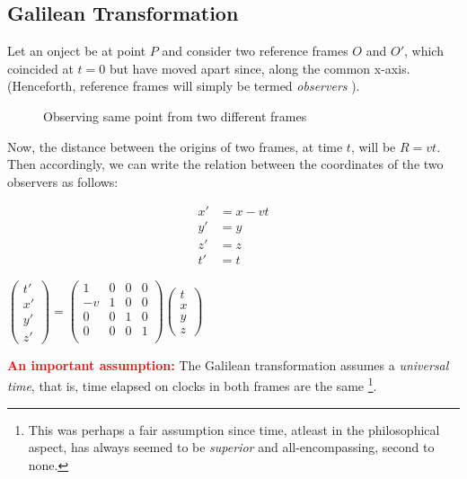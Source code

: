 \subsection{Galilean Transformation}
Let an onject be at point $P$ and consider two reference frames $O$ and $O'$, which coincided at $t=0$ but have moved apart since, along the common x-axis. (Henceforth, reference frames will simply be termed \textit{observers} ).
\begin{figure}[H]
    \centering 
    
    \caption{Observing same point from two different frames}
    \label{fig:gal_rel}
\end{figure}
\noindent
Now, the distance between the origins of two frames, at time $t$, will be $R = vt$. Then accordingly, we can write the relation between the coordinates of the two observers as follows:
   \begin{center}
     \begin{minipage}{0.5\textwidth}
    \begin{align*}
        x' &= x-vt\\
        y'&=y\\
        z' &=z \\
        t'&=t
    \end{align*}
\end{minipage}\hfill
\begin{minipage}{0.5\textwidth}
    
    
    $\begin{pmatrix}
        t'\\x'\\y'\\z'
    \end{pmatrix} = \begin{pmatrix}
        1&0&0&0 \\
        -v&1&0&0 \\
        0&0&1&0 \\
        0&0&0&1 \\
    \end{pmatrix}    \begin{pmatrix}
        t\\x\\y\\z
    \end{pmatrix}$
\end{minipage}
   \end{center}
\textcolor{red}{\textbf{An important assumption:}} The Galilean transformation assumes a \textit{universal time}, that is, time elapsed on clocks in both frames are the same \footnote{This was perhaps a fair assumption since time, atleast in the philosophical aspect, has always seemed to be \textit{superior} and all-encompassing, second to none. }.\\[0.2cm]
